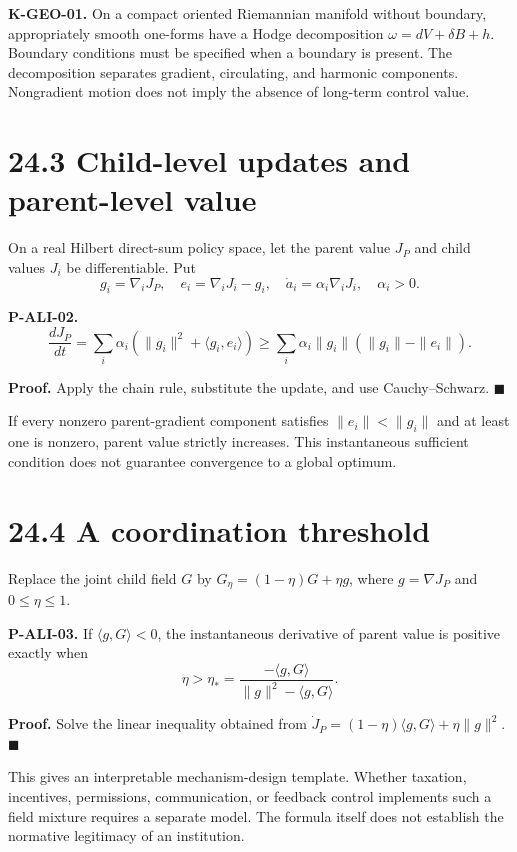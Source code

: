 \documentclass[
  english,
  11pt,
  oneside]{book}
\begin{document}
\textbf{K-GEO-01.} On a compact oriented Riemannian manifold without boundary, appropriately smooth one-forms have a Hodge decomposition \(\omega=dV+\delta B+h\). Boundary conditions must be specified when a boundary is present. The decomposition separates gradient, circulating, and harmonic components. Nongradient motion does not imply the absence of long-term control value.

\section{24.3 Child-level updates and parent-level value}\label{child-level-updates-and-parent-level-value}

On a real Hilbert direct-sum policy space, let the parent value \(J_P\) and child values \(J_i\) be differentiable. Put \[g_i=\nabla_iJ_P,\quad
e_i=\nabla_iJ_i-g_i,\quad
\dot a_i=\alpha_i\nabla_iJ_i,\quad\alpha_i>0.\]

\hypertarget{p-ali-02}{}\label{p-ali-02}

\textbf{P-ALI-02.} \[\frac{dJ_P}{dt}
=\sum_i\alpha_i(\|g_i\|^2+\langle g_i,e_i\rangle)
\ge\sum_i\alpha_i\|g_i\|(\|g_i\|-\|e_i\|).\]

\textbf{Proof.} Apply the chain rule, substitute the update, and use Cauchy--Schwarz. \(\blacksquare\)

If every nonzero parent-gradient component satisfies \(\|e_i\|<\|g_i\|\) and at least one is nonzero, parent value strictly increases. This instantaneous sufficient condition does not guarantee convergence to a global optimum.

\section{24.4 A coordination threshold}\label{a-coordination-threshold}

Replace the joint child field \(G\) by \(G_\eta=(1-\eta)G+\eta g\), where \(g=\nabla J_P\) and \(0\le\eta\le1\).

\hypertarget{p-ali-03}{}\label{p-ali-03}

\textbf{P-ALI-03.} If \(\langle g,G\rangle<0\), the instantaneous derivative of parent value is positive exactly when \[\eta>
\eta_*=\frac{-\langle g,G\rangle}
{\|g\|^2-\langle g,G\rangle}.\]

\textbf{Proof.} Solve the linear inequality obtained from \(\dot J_P=(1-\eta)\langle g,G\rangle+\eta\|g\|^2\). \(\blacksquare\)

This gives an interpretable mechanism-design template. Whether taxation, incentives, permissions, communication, or feedback control implements such a field mixture requires a separate model. The formula itself does not establish the normative legitimacy of an institution.
\end{document}
